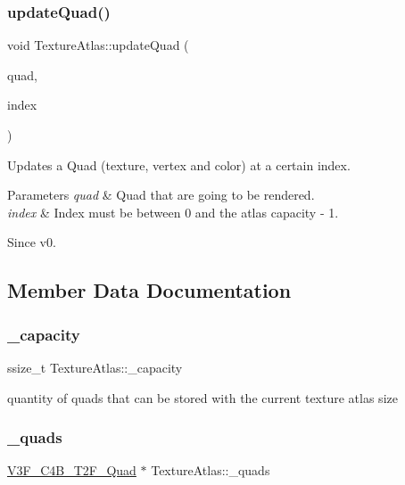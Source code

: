 \subsubsection{\texorpdfstring{update\+Quad()}{updateQuad()}\hspace{0.1cm}{\footnotesize\ttfamily [2/2]}}
{\footnotesize\ttfamily void Texture\+Atlas\+::update\+Quad (\begin{DoxyParamCaption}\item[{\hyperlink{structV3F__C4B__T2F__Quad}{V3\+F\+\_\+\+C4\+B\+\_\+\+T2\+F\+\_\+\+Quad} $\ast$}]{quad,  }\item[{ssize\+\_\+t}]{index }\end{DoxyParamCaption})}

Updates a Quad (texture, vertex and color) at a certain index. 
\begin{DoxyParams}{Parameters}
{\em quad} & Quad that are going to be rendered. \\
\hline
{\em index} & Index must be between 0 and the atlas capacity -\/ 1. \\
\hline
\end{DoxyParams}
\begin{DoxySince}{Since}
v0. 
\end{DoxySince}


\subsection{Member Data Documentation}
\mbox{\label{classTextureAtlas_a27aaf85e903dedaa496bb88e58b6d9b7}} 
\subsubsection{\texorpdfstring{\+\_\+capacity}{\_capacity}}
{\footnotesize\ttfamily ssize\+\_\+t Texture\+Atlas\+::\+\_\+capacity\hspace{0.3cm}{\ttfamily [protected]}}

quantity of quads that can be stored with the current texture atlas size \mbox{\label{classTextureAtlas_a923f5462dd2253d7391f39edbd92f9cf}} 
\subsubsection{\texorpdfstring{\+\_\+quads}{\_quads}}
{\footnotesize\ttfamily \hyperlink{structV3F__C4B__T2F__Quad}{V3\+F\+\_\+\+C4\+B\+\_\+\+T2\+F\+\_\+\+Quad} $\ast$ Texture\+Atlas\+::\+\_\+quads\hspace{0.3cm}{\ttfamily [protected]}}

